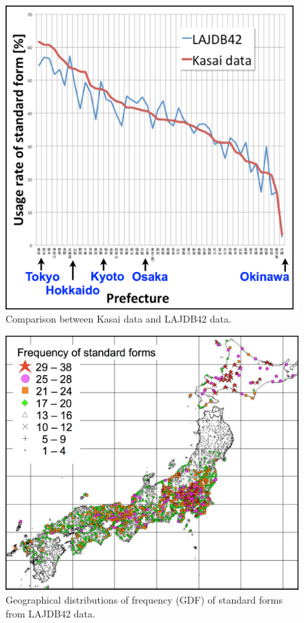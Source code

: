 \documentclass[output=paper]{LSP/langsci}
\begin{document}
\begin{figure}[p]
\includegraphics[height=0.4\textheight]{illustrations/kuma_fig05}
\caption{Comparison between Kasai data and LAJDB42 data.}    
\label{fig:kuma:5}
\end{figure} 
  
\begin{figure}[p]
\includegraphics[height=0.4\textheight]{illustrations/kuma_fig06}
\caption{Geographical distributions of frequency (GDF) of standard forms from LAJDB42 data.}          
\label{fig:kuma:6}
\end{figure} 
\end{document}
